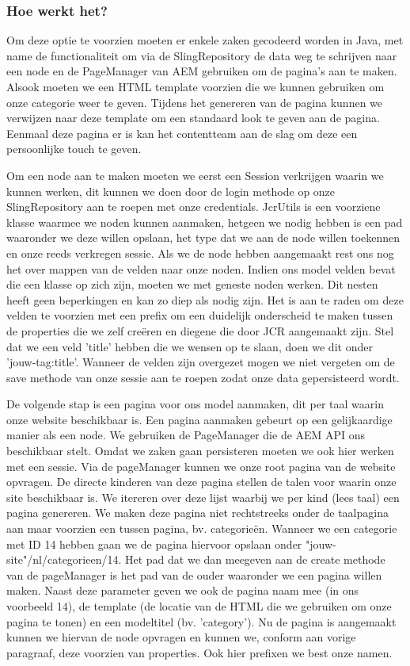 	\subsubsection{Hoe werkt het?}
	Om deze optie te voorzien moeten er enkele zaken gecodeerd worden in Java, met name de functionaliteit om via de SlingRepository de data weg te schrijven naar een node en de PageManager van AEM gebruiken om de pagina's aan te maken. Alsook moeten we een HTML template voorzien die we kunnen gebruiken om onze categorie weer te geven. Tijdens het genereren van de pagina kunnen we verwijzen naar deze template om een standaard look te geven aan de pagina. Eenmaal deze pagina er is kan het contentteam aan de slag om deze een persoonlijke touch te geven.
	\par
	Om een node aan te maken moeten we eerst een Session verkrijgen waarin we kunnen werken, dit kunnen we doen door de login methode op onze SlingRepository aan te roepen met onze credentials. JcrUtils is een voorziene klasse waarmee we noden kunnen aanmaken, hetgeen we nodig hebben is een pad waaronder we deze willen opslaan, het type dat we aan de node willen toekennen en onze reeds verkregen sessie. Als we de node hebben aangemaakt rest ons nog het over mappen van de velden naar onze noden. Indien ons model velden bevat die een klasse op zich zijn, moeten we met geneste noden werken. Dit nesten heeft geen beperkingen en kan zo diep als nodig zijn. Het is aan te raden om deze velden te voorzien met een prefix om een duidelijk onderscheid te maken tussen de properties die we zelf cre\"eren en diegene die door JCR aangemaakt zijn. Stel dat we een veld 'title' hebben die we wensen op te slaan, doen we dit onder 'jouw-tag:title'. Wanneer de velden zijn overgezet mogen we niet vergeten om de save methode van onze sessie aan te roepen zodat onze data gepersisteerd wordt.
	\par
	De volgende stap is een pagina voor ons model aanmaken, dit per taal waarin onze website beschikbaar is. Een pagina aanmaken gebeurt op een gelijkaardige manier als een node. We gebruiken de PageManager die de AEM API ons beschikbaar stelt. Omdat we zaken gaan persisteren moeten we ook hier werken met een sessie. Via de pageManager kunnen we onze root pagina van de website opvragen. De directe kinderen van deze pagina stellen de talen voor waarin onze site beschikbaar is. We itereren over deze lijst waarbij we per kind (lees taal) een pagina genereren. We maken deze pagina niet rechtstreeks onder de taalpagina aan maar voorzien een tussen pagina, bv. categorie\"en. Wanneer we een categorie met ID 14 hebben gaan we de pagina hiervoor opslaan onder "jouw-site"/nl/categorieen/14. Het pad dat we dan meegeven aan de create methode van de pageManager is het pad van de ouder waaronder we een pagina willen maken. Naast deze parameter geven we ook de pagina naam mee (in ons voorbeeld 14), de template (de locatie van de HTML die we gebruiken om onze pagina te tonen) en een modeltitel (bv. 'category'). Nu de pagina is aangemaakt kunnen we hiervan de node opvragen en kunnen we, conform aan vorige paragraaf, deze voorzien van properties. Ook hier prefixen we best onze namen.
